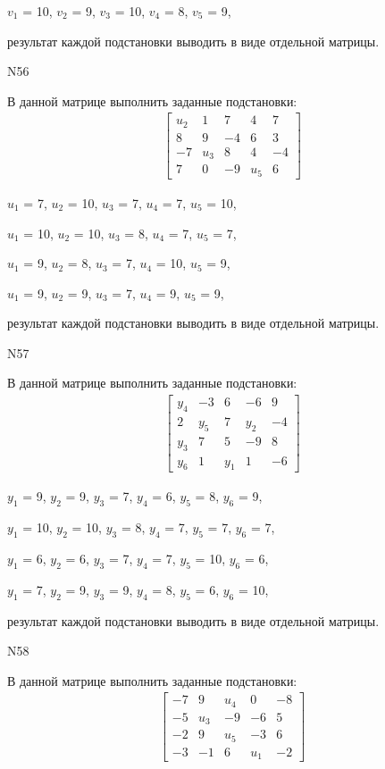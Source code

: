 \documentclass[11pt]{report}
\begin{document}
$v_{1}$ = 10, $v_{2}$ = 9, $v_{3}$ = 10, $v_{4}$ = 8, $v_{5}$ = 9, 

результат каждой подстановки выводить в виде отдельной матрицы.

N56

В данной матрице выполнить заданные подстановки:
\begin{align*}
\left[\begin{matrix}u_{2} & 1 & 7 & 4 & 7\\8 & 9 & -4 & 6 & 3\\-7 & u_{3} & 8 & 4 & -4\\7 & 0 & -9 & u_{5} & 6\end{matrix}\right]
\end{align*}


$u_{1}$ = 7, $u_{2}$ = 10, $u_{3}$ = 7, $u_{4}$ = 7, $u_{5}$ = 10, 

$u_{1}$ = 10, $u_{2}$ = 10, $u_{3}$ = 8, $u_{4}$ = 7, $u_{5}$ = 7, 

$u_{1}$ = 9, $u_{2}$ = 8, $u_{3}$ = 7, $u_{4}$ = 10, $u_{5}$ = 9, 

$u_{1}$ = 9, $u_{2}$ = 9, $u_{3}$ = 7, $u_{4}$ = 9, $u_{5}$ = 9, 

результат каждой подстановки выводить в виде отдельной матрицы.

N57

В данной матрице выполнить заданные подстановки:
\begin{align*}
\left[\begin{matrix}y_{4} & -3 & 6 & -6 & 9\\2 & y_{5} & 7 & y_{2} & -4\\y_{3} & 7 & 5 & -9 & 8\\y_{6} & 1 & y_{1} & 1 & -6\end{matrix}\right]
\end{align*}


$y_{1}$ = 9, $y_{2}$ = 9, $y_{3}$ = 7, $y_{4}$ = 6, $y_{5}$ = 8, $y_{6}$ = 9, 

$y_{1}$ = 10, $y_{2}$ = 10, $y_{3}$ = 8, $y_{4}$ = 7, $y_{5}$ = 7, $y_{6}$ = 7, 

$y_{1}$ = 6, $y_{2}$ = 6, $y_{3}$ = 7, $y_{4}$ = 7, $y_{5}$ = 10, $y_{6}$ = 6, 

$y_{1}$ = 7, $y_{2}$ = 9, $y_{3}$ = 9, $y_{4}$ = 8, $y_{5}$ = 6, $y_{6}$ = 10, 

результат каждой подстановки выводить в виде отдельной матрицы.

N58

В данной матрице выполнить заданные подстановки:
\begin{align*}
\left[\begin{matrix}-7 & 9 & u_{4} & 0 & -8\\-5 & u_{3} & -9 & -6 & 5\\-2 & 9 & u_{5} & -3 & 6\\-3 & -1 & 6 & u_{1} & -2\end{matrix}\right]
\end{align*}
\end{document}
